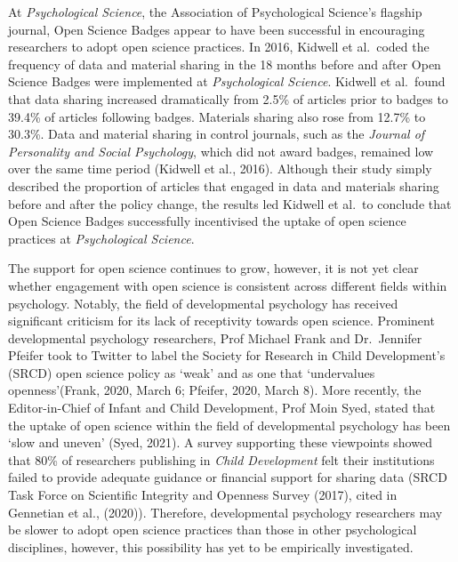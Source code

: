 \documentclass[
  english,
  man,floatsintext]{apa6}
\begin{document}
At \emph{Psychological Science}, the Association of Psychological Science's flagship journal, Open Science Badges appear to have been successful in encouraging researchers to adopt open science practices. In 2016, Kidwell et al.~coded the frequency of data and material sharing in the 18 months before and after Open Science Badges were implemented at \emph{Psychological Science}. Kidwell et al.~found that data sharing increased dramatically from 2.5\% of articles prior to badges to 39.4\% of articles following badges. Materials sharing also rose from 12.7\% to 30.3\%. Data and material sharing in control journals, such as the \emph{Journal of Personality and Social Psychology}, which did not award badges, remained low over the same time period (Kidwell et al., 2016). Although their study simply described the proportion of articles that engaged in data and materials sharing before and after the policy change, the results led Kidwell et al.~to conclude that Open Science Badges successfully incentivised the uptake of open science practices at \emph{Psychological Science}.

The support for open science continues to grow, however, it is not yet clear whether engagement with open science is consistent across different fields within psychology. Notably, the field of developmental psychology has received significant criticism for its lack of receptivity towards open science. Prominent developmental psychology researchers, Prof Michael Frank and Dr.~Jennifer Pfeifer took to Twitter to label the Society for Research in Child Development's (SRCD) open science policy as `weak' and as one that `undervalues openness'(Frank, 2020, March 6; Pfeifer, 2020, March 8). More recently, the Editor-in-Chief of Infant and Child Development, Prof Moin Syed, stated that the uptake of open science within the field of developmental psychology has been `slow and uneven' (Syed, 2021). A survey supporting these viewpoints showed that 80\% of researchers publishing in \emph{Child Development} felt their institutions failed to provide adequate guidance or financial support for sharing data (SRCD Task Force on Scientific Integrity and Openness Survey (2017), cited in Gennetian et al., (2020)). Therefore, developmental psychology researchers may be slower to adopt open science practices than those in other psychological disciplines, however, this possibility has yet to be empirically investigated.
\end{document}

